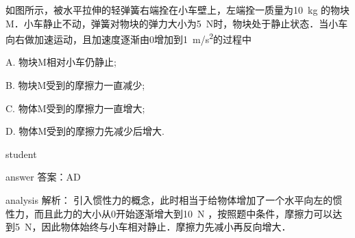 \begin{example}
	 如图所示，被水平拉伸的轻弹簧右端拴在小车壁上，左端拴一质量为\SI{10}{kg} 的物块M．小车静止不动，弹簧对物块的弹力大小为\SI{5}{N}时，物块处于静止状态．当小车向右做加速运动，且加速度逐渐由0增加到\SI{1}{m/s^2}的过程中
	 
	 A. 物块M相对小车仍静止; 
	 
	 B. 物块M受到的摩擦力一直减少; 
	 
	 C. 物体M受到的摩擦力一直增大; 
	 
	 D. 物体M受到的摩擦力先减少后增大.
	 
	
	\begin{taggedblock}{student}
		\vspace*{2cm}
	\end{taggedblock}
	
	
	\begin{taggedblock}{answer}
		答案：AD
	\end{taggedblock}
	
	
	\begin{taggedblock}{analysis}
		解析： 引入惯性力的概念，此时相当于给物体增加了一个水平向左的惯性力，而且此力的大小从0开始逐渐增大到\SI{10}{N} ，按照题中条件，摩擦力可以达到\SI{5}{N}，因此物体始终与小车相对静止．摩擦力先减小再反向增大．
	\end{taggedblock}
\end{example}



